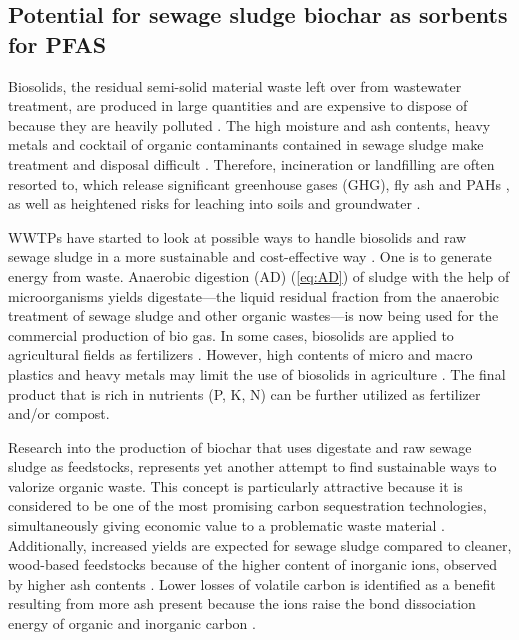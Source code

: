 \subsection{Potential for sewage sludge biochar as sorbents for PFAS}
Biosolids, the residual semi-solid material waste left over from wastewater treatment, are produced in large quantities and are expensive to dispose of because they are heavily polluted \citep{Raheem2018}. The high moisture and ash contents, heavy metals and cocktail of organic contaminants contained in sewage sludge make treatment and disposal difficult \citep{Li2019}. Therefore, incineration or landfilling are often resorted to, which release significant greenhouse gases (GHG), fly ash and PAHs \citep{huang2022comparative}, as well as heightened risks for leaching into soils and groundwater \citep{propp2021organic}. 

WWTPs have started to look at possible ways to handle biosolids and raw sewage sludge in a more sustainable and cost-effective way \citep{Raheem2018}. One is to generate energy from waste. Anaerobic digestion (AD) (\cref{eq:AD}) of sludge with the help of microorganisms yields digestate---the liquid residual fraction from the anaerobic treatment of sewage sludge and other organic wastes---is now being used for the commercial production of bio gas. In some cases, biosolids are applied to agricultural fields as fertilizers \citep{moodie2021legacy}. However, high contents of micro and macro plastics and heavy metals may limit the use of biosolids in agriculture \citep{mohajerani2020microplastics}. The final product that is rich in nutrients (P, K, N) can be further utilized as fertilizer and/or compost. 

Research into the production of biochar that uses digestate and raw sewage sludge as feedstocks, represents yet another attempt to find sustainable ways to valorize organic waste. This concept is particularly attractive because it is considered to be one of the most promising carbon sequestration technologies, simultaneously giving economic value to a problematic waste material \citep{arvaniti2014sorption}. Additionally, increased yields are expected for sewage sludge compared to cleaner, wood-based feedstocks because of the higher content of inorganic ions, observed by higher ash contents \citep{Cantrell2012}. Lower losses of volatile carbon is identified as a benefit resulting from more ash present because the ions raise the bond dissociation energy of organic and inorganic carbon \citep{Cantrell2012,Enders2012}. 

